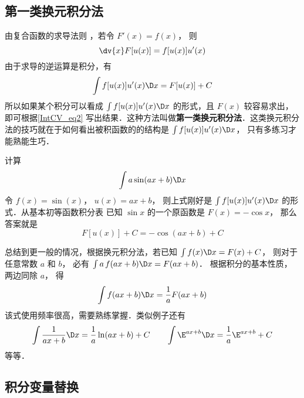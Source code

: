
\subsection{第一类换元积分法}
由复合函数的求导法则%
，若令 $F'(x) = f(x)$， 则
\begin{equation}
\dv{x}	F[u(x)] = f[u(x)]u'(x)
\end{equation}
由于求导的逆运算是积分，有
\begin{equation}\label{IntCV_eq2}
\int f[u(x)]u'(x) \D x  = F[u(x)] + C
\end{equation}
所以如果某个积分可以看成 $\int f[u(x)]u'(x)\D x$ 的形式，且 $F(x)$ 较容易求出，即可根据\autoref{IntCV_eq2} 写出结果．这种方法叫做\textbf{第一类换元积分法}．这类换元积分法的技巧就在于如何看出被积函数的的结构是 $\int f[u(x)]u'(x)\D x$， 只有多练习才能熟能生巧． 

\begin{exam}{}
计算
\begin{equation}
\int a\sin(ax + b) \D x
\end{equation}
令 $f(x) = \sin(x)$， $u(x) = ax + b$， 则上式刚好是 $\int f[u(x)]u'(x)\D x$ 的形式．从基本初等函数积分表 %
已知 $\sin x$ 的一个原函数是 $F(x) = -\cos x$， 那么答案就是
\begin{equation}
F[u(x)] + C =  - \cos(ax + b) + C
\end{equation}
\end{exam}

总结到更一般的情况，根据换元积分法，若已知 $\int f(x)\D x  = F(x) + C$， 则对于任意常数 $a$ 和 $b$， 必有 $\int a\,f(ax + b)\D x  = F(ax + b)$． 根据积分的基本性质，%
两边同除 $a$， 得
\begin{equation}
\int {f(ax + b) \D x}  = \frac{1}{a}F(ax + b)
\end{equation}
该式使用频率很高，需要熟练掌握．类似例子还有
\begin{equation}
\int \frac{1}{ax+b}\D x = \frac{1}{a}\ln (ax + b)+C  \qquad
\int \E^{ax + b}\D x = \frac{1}{a}{\E^{ax + b}}+C
\end{equation}
等等．

\subsection{积分变量替换}

